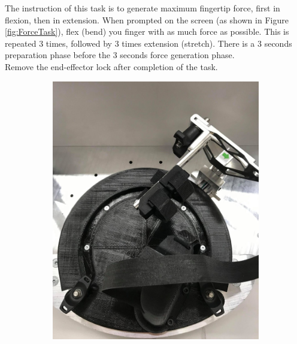 \documentclass[10pt,oneside,a4paper]{article}
\begin{document}
The instruction of this task is to generate maximum fingertip force, first in flexion, then in extension. When prompted on the screen (as shown in Figure \ref{fig:ForceTask}), flex (bend) you finger with as much force as possible. This is repeated 3 times, followed by 3 times extension (stretch). There is a 3 seconds preparation phase before the 3 seconds force generation phase. \\

Remove the end-effector lock after completion of the task. 

\begin{figure}[h!]
\centering
\begin{subfigure}[b]{0.48\textwidth}
	\includegraphics[width=\textwidth]{images/Hardware/ForceTask1.jpg}
\end{subfigure}
\hfill
\begin{subfigure}[b]{0.48\textwidth}

\end{subfigure}
\end{figure}
\end{document}
